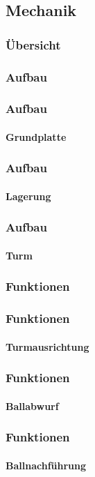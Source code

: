 \subsection{Mechanik}

\author{Christian Schürch}

\begin{frame}
	\frametitle{Übersicht\hfill{}\footnotesize \group}
\end{frame}

\subsubsection{Aufbau}
\begin{frame}
	\frametitle{Aufbau\hfill{}\footnotesize \group}
	\framesubtitle{Grundplatte}
\end{frame}

\begin{frame}
	\frametitle{Aufbau\hfill{}\footnotesize \group}
	\framesubtitle{Lagerung}
\end{frame}

\begin{frame}
	\frametitle{Aufbau\hfill{}\footnotesize \group}
	\framesubtitle{Turm}
\end{frame}

\subsubsection{Funktionen}
\begin{frame}
	\frametitle{Funktionen\hfill{}\footnotesize \group}
	\framesubtitle{Turmausrichtung}
\end{frame}

\begin{frame}
	\frametitle{Funktionen\hfill{}\footnotesize \group}
	\framesubtitle{Ballabwurf}
\end{frame}

\begin{frame}
	\frametitle{Funktionen\hfill{}\footnotesize \group}
	\framesubtitle{Ballnachführung}
\end{frame}
